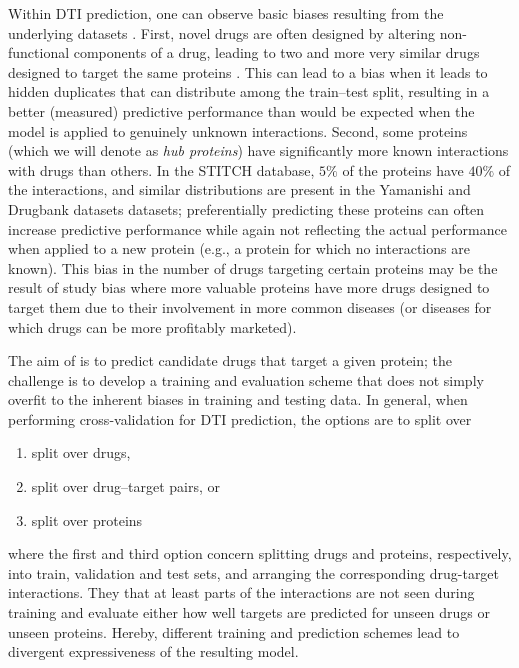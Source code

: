 \documentclass{bioinfo}
\renewcommand{\cite}{\citep}
\begin{document}
Within DTI prediction, one can observe basic biases resulting from the
underlying datasets \citep{Pahikkala2014}. First, novel drugs are
often designed by altering non-functional components of a drug,
leading to two and more very similar drugs designed to target the same
proteins \cite{Overington2006}. This can lead to a bias when it leads
to \glqq hidden duplicates\grqq{} that can distribute among the
train--test split, resulting in a better (measured) predictive
performance than would be expected when the model is applied to
genuinely unknown interactions. Second, some proteins (which we will
denote as \textit{hub proteins}) have significantly more known
interactions with drugs than others. In the STITCH database, $5\%$
of the proteins have $40\%$ of the interactions, and similar
distributions are present in the Yamanishi and Drugbank datasets
\cite{Drugbank2007, Drugbank2017} datasets; preferentially predicting
these proteins can often increase predictive performance while again
not reflecting the actual performance when applied to a new protein
(e.g., a protein for which no interactions are known). This bias in
the number of drugs targeting certain proteins may be the result of
study bias where more \glqq valuable\grqq{} proteins have more drugs
designed to target them due to their involvement in more common
diseases (or diseases for which drugs can be more profitably
marketed).

The aim of \name is to predict candidate drugs that target a given
protein; the challenge is to develop a training and evaluation scheme
that does not simply overfit to the inherent biases in training and
testing data.
In general, when performing cross-validation for DTI prediction, the
options are to split over 
\begin{enumerate}
	\item split over drugs,
	\item split over drug--target pairs, or
	\item split over proteins
\end{enumerate}
where the first and third option concern splitting drugs and proteins, respectively, into train, validation and test sets, and arranging the corresponding drug-target interactions. They that at least parts of the interactions are not seen during training and evaluate either how well targets are predicted for unseen drugs or unseen proteins. Hereby, different training and prediction schemes lead to divergent expressiveness of the resulting model. \\
\end{document}
